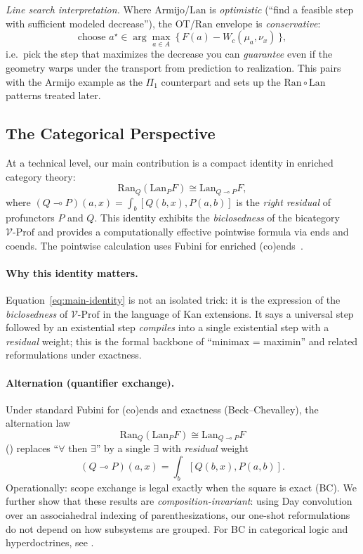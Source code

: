 \documentclass[11pt]{article}
\numberwithin{equation}{section}
\theoremstyle{upright}
\newcommand{\V}{\mathcal{V}}
\newcommand{\Prof}{\mathrm{Prof}}
\newcommand{\Lan}{\mathrm{Lan}}
\newcommand{\Ran}{\mathrm{Ran}}
\begin{document}
\medskip
\noindent\emph{Line search interpretation.}
Where Armijo/\(\Lan\) is \emph{optimistic} (“find a feasible step with sufficient modeled decrease”), the OT/\(\Ran\) envelope is \emph{conservative}:
\[
\text{choose }a^\star\in\arg\max_{a\in A}\ \Big\{\,F(a)-W_c(\mu_a,\nu_x)\,\Big\},
\]
i.e.\ pick the step that maximizes the decrease you can \emph{guarantee} even if the geometry warps under the transport from prediction to realization. This pairs with the Armijo example as the $\Pi_1$ counterpart and sets up the $\Ran\!\circ\!\Lan$ patterns treated later.

\subsection{The Categorical Perspective}

At a technical level, our main contribution is a compact identity in enriched category theory:
\begin{equation}\label{eq:main-identity}
\Ran_Q(\Lan_P F) \cong \Lan_{Q \multimap P} F,
\end{equation}
where $(Q \multimap P)(a,x) = \int_b [Q(b,x), P(a,b)]$ is the \emph{right residual} of profunctors $P$ and $Q$. This identity exhibits the \emph{biclosedness} of the bicategory $\V\text{-}\Prof$ and provides a computationally effective pointwise formula via ends and coends. The pointwise calculation uses Fubini for enriched (co)ends~\cite{Dubuc1970}.

\paragraph{Why this identity matters.}
Equation~\eqref{eq:main-identity} is not an isolated trick: it is the expression of the \emph{biclosedness} of $\V\text{-}\Prof$ in the language of Kan extensions. It says a universal step followed by an existential step \emph{compiles} into a single existential step with a \emph{residual} weight; this is the formal backbone of \enquote{minimax = maximin} and related reformulations under exactness. 

\paragraph{Alternation (quantifier exchange).}
Under standard Fubini for (co)ends and exactness (Beck--Chevalley), the alternation law
\[
\Ran_Q(\Lan_P F) \cong \Lan_{Q\multimap P} F
\]
() replaces ``$\forall$ then $\exists$'' by a single $\exists$ with \emph{residual} weight
\[
(Q\multimap P)(a,x) = \int_{b}[Q(b,x), P(a,b)].
\]
Operationally: scope exchange is legal exactly when the square is exact (BC). We further show that these results are \emph{composition-invariant}: using Day convolution over an associahedral indexing of parenthesizations, our one-shot reformulations do not depend on how subsystems are grouped. For BC in categorical logic and hyperdoctrines, see \cite{Seely1983,Jacobs1999}.
\end{document}

